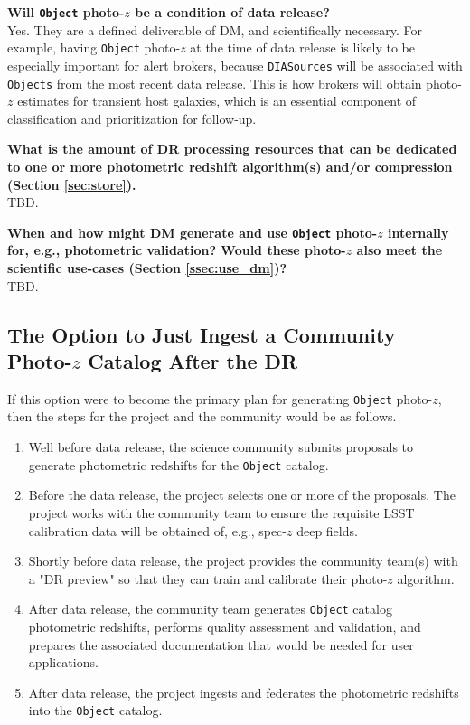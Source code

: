 \documentclass[DM,lsstdraft,toc]{lsstdoc}
\begin{document}
{\bf Will {\tt Object} photo-$z$ be a condition of data release?}\\
Yes. 
They are a defined deliverable of DM, and scientifically necessary. 
For example, having {\tt Object} photo-$z$ at the time of data release is likely to be especially important for alert brokers, because {\tt DIASources} will be associated with {\tt Objects} from the most recent data release. 
This is how brokers will obtain photo-$z$ estimates for transient host galaxies, which is an essential component of classification and prioritization for follow-up.

{\bf What is the amount of DR processing resources that can be dedicated to one or more photometric redshift algorithm(s) and/or compression (Section \ref{sec:store}).} \\
TBD.

{\bf When and how might DM generate and use {\tt Object} photo-$z$ internally for, e.g., photometric validation? Would these photo-$z$ also meet the scientific use-cases (Section \ref{ssec:use_dm})?} \\
TBD.

\subsection{The Option to Just Ingest a Community Photo-$z$ Catalog After the DR}\label{ssec:path_ingest}

If this option were to become the primary plan for generating {\tt Object} photo-$z$, then the steps for the project and the community would be as follows.

\begin{enumerate}[noitemsep,topsep=-10pt]
\item Well before data release, the science community submits proposals to generate photometric redshifts for the {\tt Object} catalog.
\item Before the data release, the project selects one or more of the proposals. 
The project works with the community team to ensure the requisite LSST calibration data will be obtained of, e.g., spec-$z$ deep fields.
\item Shortly before data release, the project provides the community team(s) with a "DR preview" so that they can train and calibrate their photo-$z$ algorithm.
\item After data release, the community team generates {\tt Object} catalog photometric redshifts, performs quality assessment and validation, and prepares the associated documentation that would be needed for user applications.
\item After data release, the project ingests and federates the photometric redshifts into the {\tt Object} catalog.
\end{enumerate}
\end{document}
